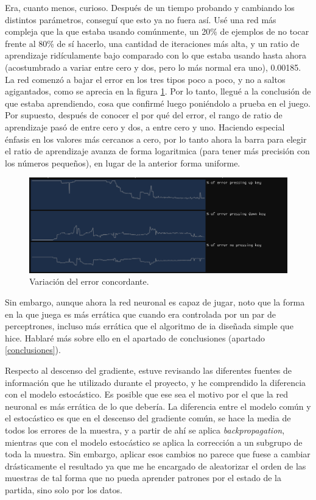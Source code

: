 Era, cuanto menos, curioso. Después de un tiempo probando y cambiando los distintos parámetros, conseguí que esto ya no fuera así. Usé una red más compleja que la que estaba usando comúnmente, un 20\% de ejemplos de no tocar frente al 80\% de sí hacerlo, una cantidad de iteraciones más alta, y un ratio de aprendizaje ridículamente bajo comparado con lo que estaba usando hasta ahora (acostumbrado a variar entre cero y dos, pero lo más normal era uno), 0.00185. La red comenzó a bajar el error en los tres tipos poco a poco, y no a saltos agigantados, como se aprecia en la figura \ref{error concordante}. Por lo tanto, llegué a la conclusión de que estaba aprendiendo, cosa que confirmé luego poniéndolo a prueba en el juego.
\\
Por supuesto, después de conocer el por qué del error, el rango de ratio de aprendizaje pasó de entre cero y dos, a entre cero y uno. Haciendo especial énfasis en los valores más cercanos a cero, por lo tanto ahora la barra para elegir el ratio de aprendizaje avanza de forma logaritmica (para tener más precisión con los números pequeños), en lugar de la anterior forma uniforme.
\begin{figure}[H]
	\centering
	\includegraphics[width=15cm]{archivos/imagenes/error-concordante.png}
	\caption{Variación del error concordante.}
	\label{error concordante}
\end{figure}

Sin embargo, aunque ahora la red neuronal es capaz de jugar, noto que la forma en la que juega es más errática que cuando era controlada por un par de perceptrones, incluso más errática que el algoritmo de \gls{ia} diseñada simple que hice. Hablaré más sobre ello en el apartado de conclusiones (apartado \ref{conclusiones}).

Respecto al descenso del gradiente, estuve revisando las diferentes fuentes de información que he utilizado durante el proyecto, y he comprendido la diferencia con el modelo estocástico. Es posible que ese sea el motivo por el que la red neuronal es más errática de lo que debería. La diferencia entre el modelo común y el estocástico es que en el descenso del gradiente común, se hace la media de todos los errores de la muestra, y a partir de ahí se aplica \textit{backpropagation}, mientras que con el modelo estocástico se aplica la corrección a un subgrupo de toda la muestra. Sin embargo, aplicar esos cambios no parece que fuese a cambiar drásticamente el resultado ya que me he encargado de aleatorizar el orden de las muestras de tal forma que no pueda aprender patrones por el estado de la partida, sino solo por los datos.

